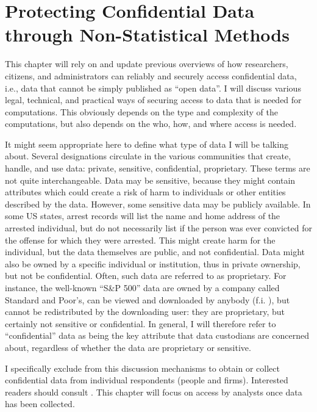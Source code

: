 \chapter{Protecting Confidential Data through Non-Statistical Methods}

This chapter will rely on and update previous overviews of how researchers, citizens, and administrators can reliably and securely access confidential data, i.e., data that cannot be simply published as ``open data''. I will discuss various legal, technical, and practical ways of securing access to data that is needed for computations. This obviously depends on the type and complexity of the computations, but also depends on the who, how, and where access is needed.

It might seem appropriate here to define what type of data I will be talking about. Several designations circulate in the various communities that create, handle, and use data: private, sensitive, confidential, proprietary. These terms are not quite interchangeable. Data may be sensitive, because they might contain attributes which could create a risk of harm to individuals or other entities described by the data. However, some sensitive data may be publicly available. In some US states, arrest records will list the name and home address of the arrested individual, but do not necessarily list if the person was ever convicted for the offense for which they were arrested. This might create harm for the individual, but the data themselves are public, and not confidential. Data might also be owned by a specific individual or institution, thus in private ownership, but not be confidential. Often, such data are referred to as proprietary. For instance, the well-known ``S\&P 500'' data are owned by a company called Standard and Poor's, can be viewed and downloaded by anybody (f.i. \cite{sp_dow_jones_indices_llc_sp_2020}), but cannot be redistributed by the downloading user: they are proprietary, but certainly not sensitive or confidential. In general, I will therefore refer to ``confidential'' data as being the key attribute that data custodians are concerned about, regardless of whether the data are proprietary or sensitive. 

I specifically exclude from this discussion mechanisms to obtain or collect confidential data from individual respondents (people and firms). Interested readers should consult \cite{groves_survey_2009}. This chapter will focus on access by analysts once data has been collected.


